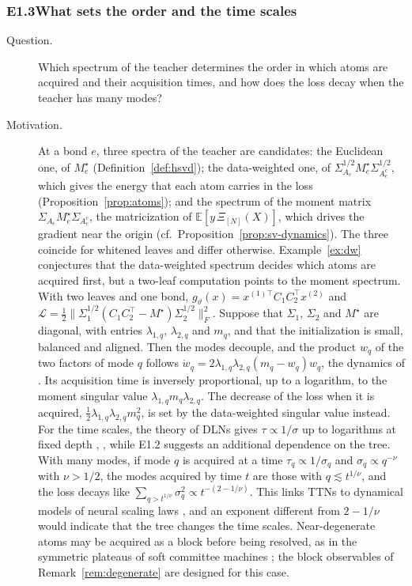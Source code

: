 \documentclass[11pt]{article}
\newcommand{\E}{\mathbb{E}}
\newcommand{\norm}[1]{\lVert #1\rVert}
\theoremstyle{definition}
\numberwithin{equation}{section}
\begin{document}
\subsubsection*{E1.3\quad What sets the order and the time scales}
\begin{description}
\item[Question.] Which spectrum of the teacher determines the order in which atoms are acquired and their acquisition times, and how does the loss decay when the teacher has many modes?
\item[Motivation.] At a bond $e$, three spectra of the teacher are candidates: the Euclidean one, of $M^\star_e$ (Definition~\ref{def:hsvd}); the data-weighted one, of $\Sigma_{A_e}^{1/2}M^\star_e\Sigma_{A_e^c}^{1/2}$, which gives the energy that each atom carries in the loss (Proposition~\ref{prop:atoms}); and the spectrum of the moment matrix $\Sigma_{A_e}M^\star_e\Sigma_{A_e^c}$, the matricization of $\E[y\,\Xi_{[N]}(X)]$, which drives the gradient near the origin (cf.\ Proposition~\ref{prop:sv-dynamics}). The three coincide for whitened leaves and differ otherwise. Example~\ref{ex:dw} conjectures that the data-weighted spectrum decides which atoms are acquired first, but a two-leaf computation points to the moment spectrum.
With two leaves and one bond, $g_\vartheta(x)=x^{(1)\top}C_1C_2^\top x^{(2)}$ and $\mathcal L=\tfrac12\norm{\Sigma_1^{1/2}(C_1C_2^\top-M^\star)\Sigma_2^{1/2}}_F^2$. Suppose that $\Sigma_1$, $\Sigma_2$ and $M^\star$ are diagonal, with entries $\lambda_{1,q}$, $\lambda_{2,q}$ and $m_q$, and that the initialization is small, balanced and aligned. Then the modes decouple, and the product $w_q$ of the two factors of mode $q$ follows $\dot w_q=2\lambda_{1,q}\lambda_{2,q}(m_q-w_q)w_q$, the dynamics of \citet{saxe2014exact}. Its acquisition time is inversely proportional, up to a logarithm, to the moment singular value $\lambda_{1,q}m_q\lambda_{2,q}$. The decrease of the loss when it is acquired, $\tfrac12\lambda_{1,q}\lambda_{2,q}m_q^2$, is set by the data-weighted singular value instead.
For the time scales, the theory of DLNs gives $\tau\propto1/\sigma$ up to logarithms at fixed depth \citep{saxe2014exact}, \citep[eq.~(4.7)]{hfl_diagonal}, while E1.2 suggests an additional dependence on the tree. With many modes, if mode $q$ is acquired at a time $\tau_q\propto1/\sigma_q$ and $\sigma_q\propto q^{-\nu}$ with $\nu>1/2$, the modes acquired by time $t$ are those with $q\lesssim t^{1/\nu}$, and the loss decays like $\sum_{q>t^{1/\nu}}\sigma_q^2\propto t^{-(2-1/\nu)}$. This links TTNs to dynamical models of neural scaling laws \citep{michaud2023quantization,bordelon2024dynamical}, and an exponent different from $2-1/\nu$ would indicate that the tree changes the time scales. Near-degenerate atoms may be acquired as a block before being resolved, as in the symmetric plateaus of soft committee machines \citep{saad1995online}; the block observables of Remark~\ref{rem:degenerate} are designed for this case.

\end{description}
\end{document}
